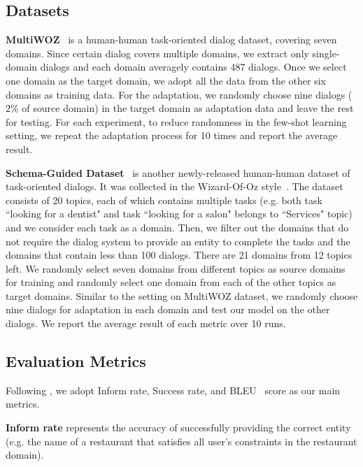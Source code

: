 \documentclass[letterpaper]{article}
\begin{document}
\subsection*{Datasets}
\label{multiwoz}
\noindent \textbf{MultiWOZ}~\citep{budzianowski2018multiwoz} is a human-human task-oriented dialog dataset, covering seven domains. Since certain dialog covers multiple domains, we extract only single-domain dialogs and each domain averagely contains 487 dialogs. Once we select one domain as the target domain, we adopt all the data from the other six domains as training data. For the adaptation, we randomly choose nine dialogs ($2\%$ of source domain) in the target domain as adaptation data and leave the rest for testing. For each experiment, to reduce randomness in the few-shot learning setting, we repeat the adaptation process for 10 times and report the average result.

\noindent\textbf{Schema-Guided Dataset}~\citep{rastogi2019towards} is another newly-released human-human dataset of task-oriented dialogs. It was collected in the Wizard-Of-Oz style~\citep{Kelley1984AnID}. The dataset consists of 20 topics, each of which contains multiple tasks (e.g. both task ``looking for a dentist" and task ``looking for a salon" belongs to ``Services" topic) and we consider each task as a domain. Then, we filter out the domains that do not require the dialog system to provide an entity to complete the tasks and the domains that contain less than 100 dialogs. There are 21 domains from 12 topics left. We randomly select seven domains from different topics as source domains for training and randomly select one domain from each of the other topics as target domains. Similar to the setting on MultiWOZ dataset, we randomly choose nine dialogs for adaptation in each domain and test our model on the other dialogs. We report the average result of each metric over 10 runs.



\subsection*{Evaluation Metrics}

Following \citet{budzianowski2018multiwoz}, we adopt Inform rate, Success rate, and BLEU~\citep{Papineni2002BleuAM} score as our main metrics.

\noindent\textbf{Inform rate} represents the accuracy of successfully providing the correct entity (e.g. the name of a restaurant that satisfies all user's constraints in the restaurant domain).
\end{document}
